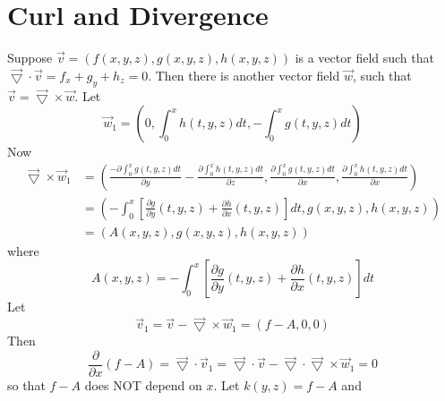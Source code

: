 \documentclass[11pt]{article}
\theoremstyle{definition}
\begin{document}
\section{Curl and Divergence}
Suppose $\overrightarrow{v} = \left( f \left( x,y,z \right) , g \left( x,y,z \right), h \left( x,y,z \right) \right)$ is a vector field such that $\overrightarrow{\bigtriangledown} \cdot \overrightarrow{v} = f_x + g_y + h_z = 0$. Then there is another vector field $\overrightarrow{w}$, such that $\overrightarrow{v} = \overrightarrow{\bigtriangledown} \times \overrightarrow{w}$. Let 
$$\overrightarrow{w}_1 = \left( 0,
\int_0^x h \left( t , y , z \right) dt, 
- \int_0^x g \left( t, y, z \right) dt
\right)$$
Now
\begin{equation}
\begin{split}
\overrightarrow{\bigtriangledown} \times \overrightarrow{w}_1 & = \left(
\frac{- \partial \int_0^x g \left( t, y, z \right) dt}{\partial y} - \frac{\partial \int_0^x h \left( t , y , z \right) dt}{\partial z},
\frac{\partial \int_0^x g \left( t, y, z \right) dt}{\partial x},
\frac{\partial \int_0^x h \left( t , y , z \right) dt}{\partial x}
\right) \\
& = \left(
- \int_0^x \left[ \frac{\partial g}{\partial y} \left( t,y,z \right) + \frac{\partial h}{\partial x} \left( t,y,z \right) \right] dt,
g \left( x,y,z \right),
h \left( x,y,z \right)
\right) \\
& = \left( A \left( x,y,z \right) ,
g \left( x,y,z \right),
h \left( x,y,z \right)
\right)
\end{split}
\end{equation}
where
\begin{equation}
A \left( x,y,z \right) = - \int_0^x \left[ \frac{\partial g}{\partial y} \left( t,y,z \right) + \frac{\partial h}{\partial x} \left( t,y,z \right) \right] dt
\end{equation}
Let
\begin{equation}
\overrightarrow{v}_1 = \overrightarrow{v} - \overrightarrow{\bigtriangledown} \times \overrightarrow{w}_1 = \left( f - A, 0 , 0 \right)
\end{equation}
Then
\begin{equation}
\frac{\partial}{\partial x} \left(f - A \right) = \overrightarrow{\bigtriangledown} \cdot \overrightarrow{v}_1 = \overrightarrow{\bigtriangledown} \cdot \overrightarrow{v} - \overrightarrow{\bigtriangledown} \cdot \overrightarrow{\bigtriangledown} \times \overrightarrow{w}_1 = 0
\end{equation}
so that $f-A$ does NOT depend on $x$. Let $k \left( y,z \right) = f-A$ and
\end{document}
